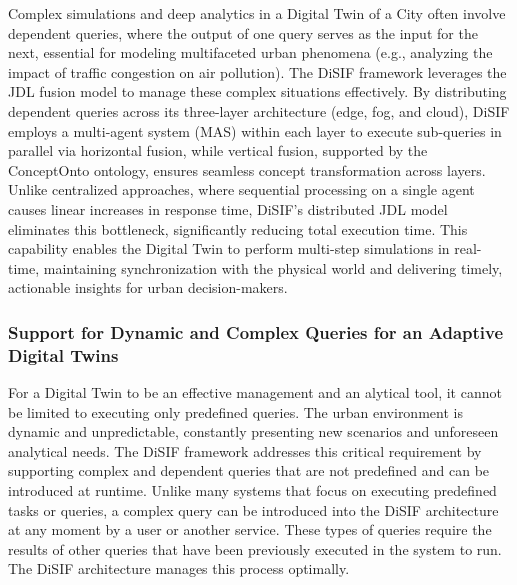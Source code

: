 \documentclass[5p,times]{elsarticle}
\begin{document}
 Complex simulations and deep analytics in a Digital Twin of a City often
  involve dependent queries, where the output of one query serves as the input
   for the next, essential for modeling multifaceted urban phenomena (e.g., analyzing
    the impact of traffic congestion on air pollution). The DiSIF framework leverages
     the JDL fusion model to manage these complex situations effectively.
      By distributing dependent queries across its three-layer architecture
       (edge, fog, and cloud), DiSIF employs a multi-agent system (MAS) within
        each layer to execute sub-queries in parallel via horizontal fusion,
         while vertical fusion, supported by the ConceptOnto ontology, ensures
          seamless concept transformation across layers. Unlike centralized 
          approaches, where sequential processing on a single agent causes linear
           increases in response time, DiSIF’s distributed JDL model eliminates
            this bottleneck, significantly reducing total execution time. 
            This capability enables the Digital Twin to perform multi-step
             simulations in real-time, maintaining synchronization with the
              physical world and delivering timely, actionable insights for urban decision-makers.


\subsubsection{ Support for Dynamic and Complex Queries for an Adaptive Digital Twins}

For a Digital Twin to be an effective management and an
alytical tool, it cannot be limited to executing only predefined
queries. The urban environment is dynamic and unpredictable,
 constantly presenting new scenarios and unforeseen analytical
 needs. The DiSIF framework addresses this critical requirement
 by supporting
 complex and dependent queries that are not predefined and
 can be introduced at runtime.
 Unlike many systems that focus on executing predefined
 tasks or queries, a complex query can be introduced into the
 DiSIF architecture at any moment by a user or another service.
 These types of queries require the results of other queries that
 have been previously executed in the system to run. The DiSIF
 architecture manages this process optimally.
\end{document}

